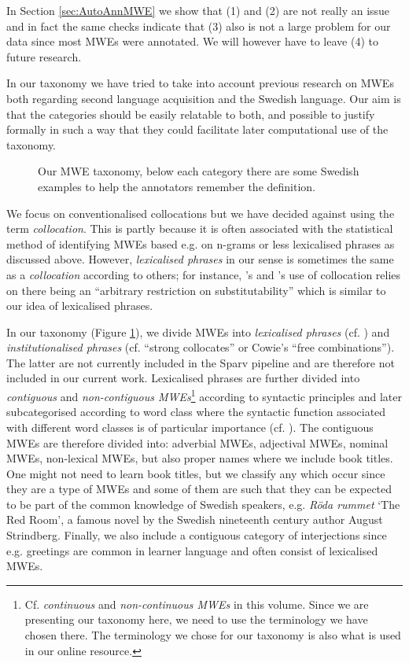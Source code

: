 \documentclass[output=paper,colorlinks,citecolor=brown]{langscibook}
\begin{document}
In Section \ref{sec:AutoAnnMWE} we show that (1) and (2) are not really an issue and in fact the same checks indicate that (3) also is not a large problem for our data since most MWEs were annotated. We will however have to leave (4) to future research.


In our taxonomy we have tried to take into account previous research on MWEs both regarding second language acquisition and the Swedish language. Our aim is that the categories should be easily relatable to both, and possible to justify formally in such a way that they could facilitate later computational use of the taxonomy. 

\begin{figure} 
    \caption{Our MWE taxonomy, below each category there are some Swedish examples to help the annotators remember the definition.}
    \label{fig:MWEtax}
\end{figure}



We focus on conventionalised collocations but we have decided against using the term \textit{collocation}. This is partly because it is often associated with the statistical method of identifying MWEs based e.g. on n-grams or less lexicalised phrases as discussed above. However, \textit{lexicalised phrases} in our sense is sometimes the same as a \textit{collocation} according to others; for instance, \citet{cowie1994phraseology}'s and \citet{nesselhauf2003use}’s use of collocation relies on there being an “arbitrary restriction on substitutability” \citep[][225]{nesselhauf2003use} which is similar to our idea of lexicalised phrases.

In our taxonomy (Figure 
\ref{fig:MWEtax}), we divide MWEs into \textit{lexicalised phrases}  
 (cf. \citet{Sag:Baldwin:2002}) and \textit{institutionalised phrases} (cf. “strong collocates” or Cowie's “free combinations”). The latter are not currently included in the Sparv pipeline and are therefore not included in our current work. 
Lexicalised phrases are further divided into \textit{contiguous} and \textit{non-contiguous MWEs}\footnote{Cf. \textit{continuous} and \textit{non-continuous MWEs} in this volume. Since we are presenting our taxonomy here, we need to use the terminology we have chosen there. The terminology we chose for our taxonomy is also what is used in our online resource.} according to syntactic principles and later subcategorised according to word class where the syntactic function associated with different word classes is of particular importance (cf. ). The contiguous MWEs are therefore divided into: adverbial MWEs, adjectival MWEs, nominal MWEs, non-lexical MWEs, but also proper names where we include book titles. One might not need to learn book titles, but we classify any which occur since they are a type of MWEs and some of them are such that they can be expected to be part of the common knowledge of Swedish speakers, e.g. \textit{Röda rummet} `The Red Room', a famous novel by the Swedish nineteenth century author August Strindberg. Finally, we also include a contiguous category of interjections since e.g. greetings are common in learner language and often consist of lexicalised MWEs.
\end{document}
